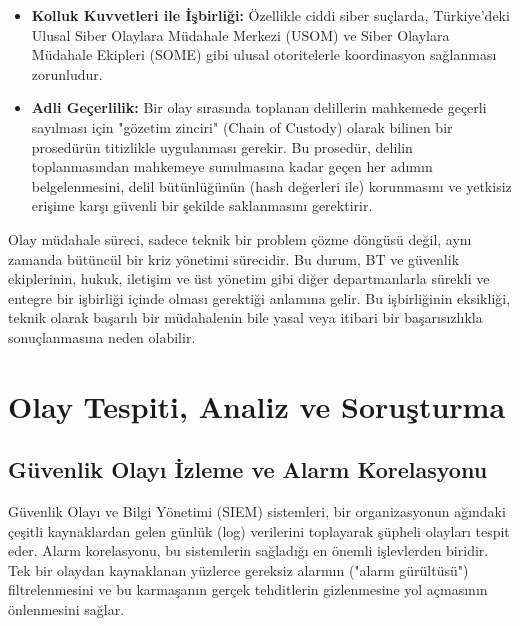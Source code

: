 \begin{itemize}
    \item \textbf{Kolluk Kuvvetleri ile İşbirliği:} Özellikle ciddi siber suçlarda, Türkiye'deki Ulusal Siber Olaylara Müdahale Merkezi (USOM) ve Siber Olaylara Müdahale Ekipleri (SOME) gibi ulusal otoritelerle koordinasyon sağlanması zorunludur.
    \item \textbf{Adli Geçerlilik:} Bir olay sırasında toplanan delillerin mahkemede geçerli sayılması için "gözetim zinciri" (Chain of Custody) olarak bilinen bir prosedürün titizlikle uygulanması gerekir. Bu prosedür, delilin toplanmasından mahkemeye sunulmasına kadar geçen her adımın belgelenmesini, delil bütünlüğünün (hash değerleri ile) korunmasını ve yetkisiz erişime karşı güvenli bir şekilde saklanmasını gerektirir.
\end{itemize}

Olay müdahale süreci, sadece teknik bir problem çözme döngüsü değil, aynı zamanda bütüncül bir kriz yönetimi sürecidir. Bu durum, BT ve güvenlik ekiplerinin, hukuk, iletişim ve üst yönetim gibi diğer departmanlarla sürekli ve entegre bir işbirliği içinde olması gerektiği anlamına gelir. Bu işbirliğinin eksikliği, teknik olarak başarılı bir müdahalenin bile yasal veya itibari bir başarısızlıkla sonuçlanmasına neden olabilir.

\section{Olay Tespiti, Analiz ve Soruşturma}

\subsection{Güvenlik Olayı İzleme ve Alarm Korelasyonu}

Güvenlik Olayı ve Bilgi Yönetimi (SIEM) sistemleri, bir organizasyonun ağındaki çeşitli kaynaklardan gelen günlük (log) verilerini toplayarak şüpheli olayları tespit eder. Alarm korelasyonu, bu sistemlerin sağladığı en önemli işlevlerden biridir. Tek bir olaydan kaynaklanan yüzlerce gereksiz alarmın ("alarm gürültüsü") filtrelenmesini ve bu karmaşanın gerçek tehditlerin gizlenmesine yol açmasının önlenmesini sağlar.

